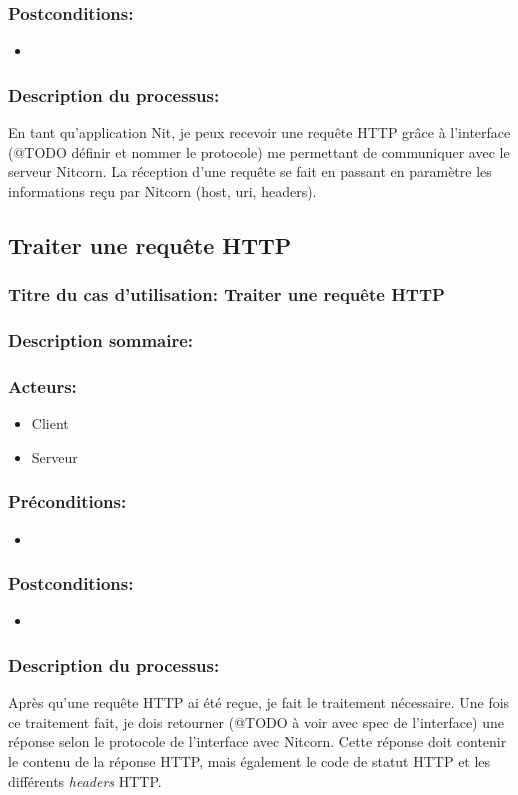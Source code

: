 \documentclass{scrreprt}
\begin{document}
\begin{itemizen}
\subsubsection{Postconditions:}
\begin{itemize}
    \item  
\end{itemize} 
\subsubsection{Description du processus:}En tant qu'application Nit, je peux recevoir une requête HTTP grâce à l'interface
(@TODO définir et nommer le protocole) me permettant de communiquer avec le serveur
Nitcorn. La réception d'une requête se fait en passant en paramètre les informations
reçu par Nitcorn (host, uri, headers).
\subsection{Traiter une requête HTTP}
\subsubsection{Titre du cas d'utilisation: Traiter une requête HTTP}
\subsubsection{Description sommaire:}
\subsubsection{Acteurs:}
\begin{itemize}
    \item Client
    \item Serveur
\end{itemize}
\subsubsection{Préconditions:}
\begin{itemize}
    \item  
\end{itemize} 
\subsubsection{Postconditions:}
\begin{itemize}
    \item  
\end{itemize} 
\subsubsection{Description du processus:}Après qu'une requête HTTP ai été reçue, je fait le traitement nécessaire.
Une fois ce traitement fait, je dois retourner (@TODO à voir avec spec de l'interface)
une réponse selon le protocole de l'interface avec Nitcorn. Cette réponse doit
contenir le contenu de la réponse HTTP, mais également le code de statut HTTP
et les différents \textit{headers} HTTP.


\end{itemizen}
\end{document}
